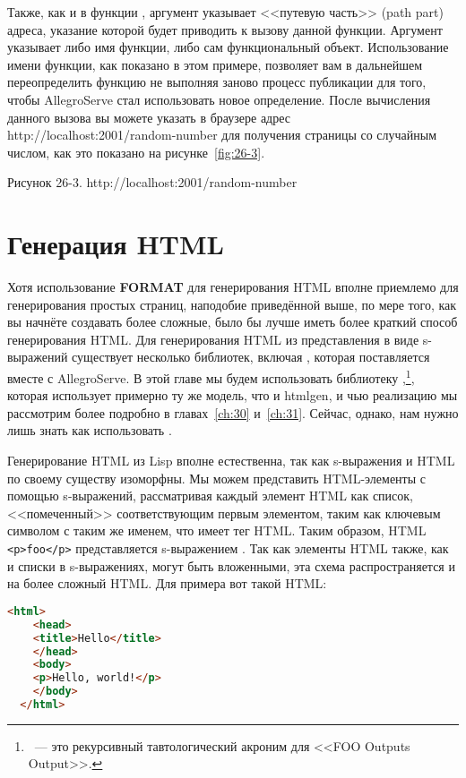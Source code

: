 Также, как и в функции , аргумент  указывает <<путевую
часть>> (path part) адреса, указание которой будет приводить к вызову данной функции.
Аргумент  указывает либо имя функции, либо сам функциональный объект.
Использование имени функции, как показано в этом примере, позволяет вам в дальнейшем
переопределить функцию не выполняя заново процесс публикации для того, чтобы AllegroServe
стал использовать новое определение. После вычисления данного вызова вы можете указать в
браузере адрес http://localhost:2001/random-number для получения страницы со случайным
числом, как это показано на рисунке~\ref{fig:26-3}.

Рисунок 26-3. http://localhost:2001/random-number

\section{Генерация HTML}

Хотя использование \textbf{FORMAT} для генерирования HTML вполне приемлемо для
генерирования простых страниц, наподобие приведённой выше, по мере того, как вы начнёте
создавать более сложные, было бы лучше иметь более краткий способ генерирования HTML. Для
генерирования HTML из представления в виде s-выражений существует несколько библиотек,
включая , которая поставляется вместе с AllegroServe. В этой главе мы будем
использовать библиотеку ,\footnote{~--- это рекурсивный тавтологический
  акроним для <<FOO Outputs Output>>.}, которая использует примерно ту же модель, что и
htmlgen, и чью реализацию мы рассмотрим более подробно в главах~\ref{ch:30}
и~\ref{ch:31}. Сейчас, однако, нам нужно лишь знать как использовать .

Генерирование HTML из Lisp вполне естественна, так как s-выражения и HTML по своему
существу изоморфны. Мы можем представить HTML-элементы с помощью s-выражений, рассматривая
каждый элемент HTML как список, <<помеченный>> соответствующим первым элементом, таким как
ключевым символом с таким же именем, что имеет тег HTML. Таким образом, HTML
\lstinline!<p>foo</p>! представляется s-выражением . Так как элементы
HTML также, как и списки в s-выражениях, могут быть вложенными, эта схема распространяется
и на более сложный HTML. Для примера вот такой HTML:

\begin{lstlisting}[language=HTML]
  <html>
    <head>
    <title>Hello</title>
    </head>
    <body>
    <p>Hello, world!</p>
    </body>
  </html>
\end{lstlisting}

